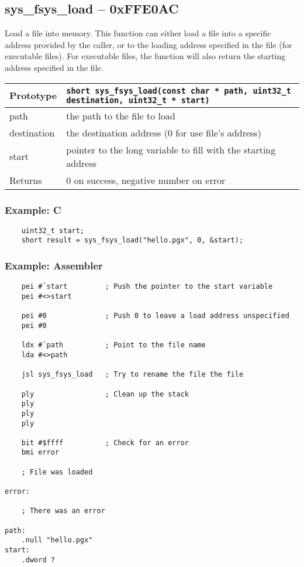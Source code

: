 \subsection*{sys\_fsys\_load -- 0xFFE0AC}
Load a file into memory. This function can either load a file into a specific address provided by the caller,
or to the loading address specified in the file (for executable files). For executable files, the function will also
return the starting address specified in the file.

\bigskip

\begin{tabular}{|l||l|} \hline
Prototype & \lstinline!short sys_fsys_load(const char * path, uint32_t destination, uint32_t * start)! \\ \hline
path & the path to the file to load \\ \hline
destination & the destination address (0 for use file's address) \\ \hline
start & pointer to the long variable to fill with the starting address \\ \hline
Returns & 0 on success, negative number on error \\ \hline
\end{tabular}

\subsubsection*{Example: C}
\begin{lstlisting}
    uint32_t start;
    short result = sys_fsys_load("hello.pgx", 0, &start);
\end{lstlisting}

\subsubsection*{Example: Assembler}
\begin{verbatim}
    pei #`start         ; Push the pointer to the start variable
    pei #<>start

    pei #0              ; Push 0 to leave a load address unspecified
    pei #0

    ldx #`path          ; Point to the file name
    lda #<>path

    jsl sys_fsys_load   ; Try to rename the file the file

    ply                 ; Clean up the stack
    ply
    ply
    ply

    bit #$ffff          ; Check for an error
    bmi error

    ; File was loaded

error:

    ; There was an error

path:
    .null "hello.pgx"
start:
    .dword ?
\end{verbatim}


